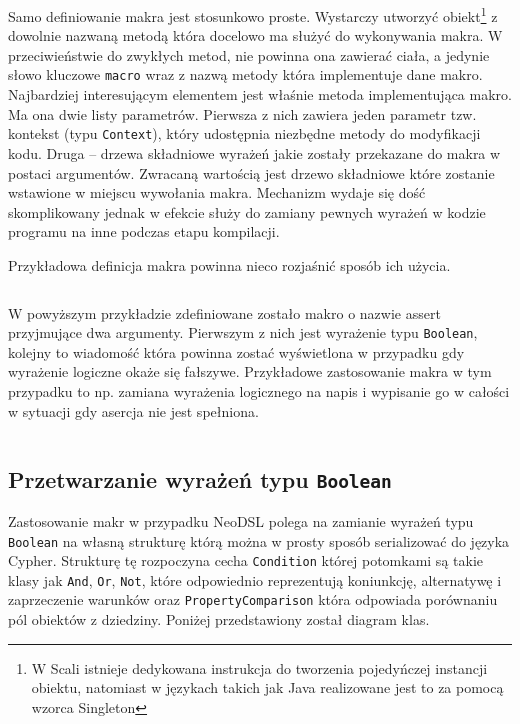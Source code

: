 \documentclass[brudnopis]{xmgr}
\begin{document}
Samo definiowanie makra jest stosunkowo proste. Wystarczy utworzyć obiekt\footnote{W Scali istnieje dedykowana instrukcja do tworzenia pojedyńczej instancji obiektu, natomiast w językach takich jak Java realizowane jest to za pomocą wzorca Singleton} z dowolnie nazwaną metodą która docelowo ma służyć do wykonywania makra. W przeciwieństwie do zwykłych metod, nie powinna ona zawierać ciała, a jedynie słowo kluczowe \texttt{macro} wraz z nazwą metody która implementuje dane makro. Najbardziej interesującym elementem jest właśnie metoda implementująca makro. Ma ona dwie listy parametrów. Pierwsza z nich zawiera jeden parametr tzw. kontekst (typu \texttt{Context}), który udostępnia niezbędne metody do modyfikacji kodu. Druga --  drzewa składniowe wyrażeń jakie zostały przekazane do makra w postaci argumentów. Zwracaną wartością jest drzewo składniowe które zostanie wstawione w miejscu wywołania makra. Mechanizm wydaje się dość skomplikowany jednak w efekcie służy do zamiany pewnych wyrażeń w kodzie programu na inne podczas etapu kompilacji.

\medskip\noindent Przykładowa definicja makra powinna nieco rozjaśnić sposób ich użycia.

\inputminted{scala}{listings/scala/macro-sample.scala}

W powyższym przykładzie zdefiniowane zostało makro o nazwie assert przyjmujące dwa argumenty. Pierwszym z nich jest wyrażenie typu \texttt{Boolean}, kolejny to wiadomość która powinna zostać wyświetlona w przypadku gdy wyrażenie logiczne okaże się fałszywe. Przykładowe zastosowanie makra w tym przypadku to np. zamiana wyrażenia logicznego na napis i wypisanie go w całości w sytuacji gdy asercja nie jest spełniona.

\inputminted{scala}{listings/scala/macro-usage-assert.scala}

\newpage

\subsection{Przetwarzanie wyrażeń typu \texttt{Boolean}}

Zastosowanie makr w przypadku NeoDSL polega na zamianie wyrażeń typu \texttt{Boolean} na własną strukturę którą można w prosty sposób serializować do języka Cypher. 
Strukturę tę rozpoczyna cecha \texttt{Condition} której potomkami są takie klasy jak \texttt{And}, \texttt{Or}, \texttt{Not}, które odpowiednio reprezentują koniunkcję, alternatywę i zaprzeczenie warunków oraz \texttt{PropertyComparison} która odpowiada porównaniu pól obiektów z dziedziny. Poniżej przedstawiony został diagram klas.
\end{document}
